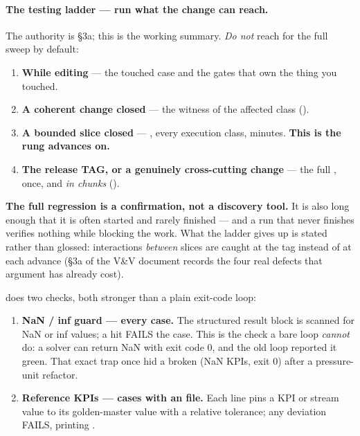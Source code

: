 \documentclass[11pt,a4paper]{article}
\begin{document}
\paragraph{The testing ladder --- run what the change can reach.}
The authority is 
\S3a; this is the working summary.  \emph{Do not} reach for the full sweep
by default:

\begin{enumerate}[leftmargin=1.6em]
  \item \textbf{While editing} --- the touched case and the 
    gates that own the thing you touched.
  \item \textbf{A coherent change closed} --- the witness of the affected
    class ().
  \item \textbf{A bounded slice closed} --- ,
    every execution class, minutes.  \textbf{This is the rung 
    advances on.}
  \item \textbf{The release TAG, or a genuinely cross-cutting change} ---
    the full , once, and \emph{in chunks}
    ().
\end{enumerate}

\begin{keyidea}
\textbf{The full regression is a confirmation, not a discovery tool.}  It is
also long enough that it is often started and rarely finished --- and a run
that never finishes verifies nothing while blocking the work.  What the
ladder gives up is stated rather than glossed: interactions \emph{between}
slices are caught at the tag instead of at each advance
(\S3a of the V\&V document records the four real defects that argument
has already cost).
\end{keyidea}

 does two checks, both stronger than a plain exit-code
loop:

\begin{enumerate}[leftmargin=1.6em]
  \item \textbf{NaN / inf guard --- every case.}  The structured result
    block is scanned for NaN or inf values; a hit FAILS the case.  This
    is the check a bare  loop
    \emph{cannot} do: a solver can return NaN with exit code 0, and the
    old loop reported it green.  That exact trap once hid a broken
     (NaN KPIs, exit 0) after a pressure-unit refactor.
  \item \textbf{Reference KPIs --- cases with an  file.}
    Each line pins a KPI or stream value to its golden-master value with
    a relative tolerance; any deviation FAILS, printing
    .
\end{enumerate}
\end{document}
